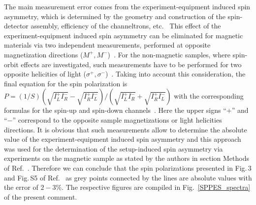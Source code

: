 \documentclass[twocolumn,preprintnumbers,amsmath,amssymb,prl]{revtex4}
\begin{document}
The main measurement error comes from the experiment-equipment induced spin asymmetry, which is determined by the geometry and construction of the spin-detector assembly, efficiency of the channeltrons, etc.~\cite{Johnson:1992} This effect of the experiment-equipment induced spin asymmetry can be eliminated for magnetic materials via two independent measurements, performed at opposite magnetization directions ($M^+, M^-$)~\cite{Johnson:1992}. For the non-magnetic samples, where spin-orbit effects are investigated, such measurements have to be performed for two opposite helicities of light ($\sigma^+, \sigma^-$)~\cite{Eyers:1984kq,Sconhense:1986ik,Sinkovic:1997hz}. Taking into account this consideration, the final equation for the spin polarization is $P=(1/S)(\sqrt{I^+_L I^-_R}-\sqrt{I^+_R I^-_L})/(\sqrt{I^+_L I^-_R}+\sqrt{I^+_R I^-_L})$ with the corresponding formulas for the spin-up and spin-down channels~\cite{Johnson:1992}. Here the upper signs ``$+$'' and ``$-$'' correspond to the opposite sample magnetizations or light helicities directions. It is obvious that such measurements allow to determine the absolute value of the experiment-equipment induced spin asymmetry and this approach was used for the determination of the setup-induced spin asymmetry via experiments on the magnetic sample as stated by the authors in section Methods of Ref.~. Therefore we can conclude that the spin polarizations presented in Fig.\,3 and Fig.\,S5 of Ref.~ as grey points connected by the lines are absolute values with the error of $2-3$\%. The respective figures are compiled in Fig.~\ref{SPPES_spectra} of the present comment.
\end{document}
